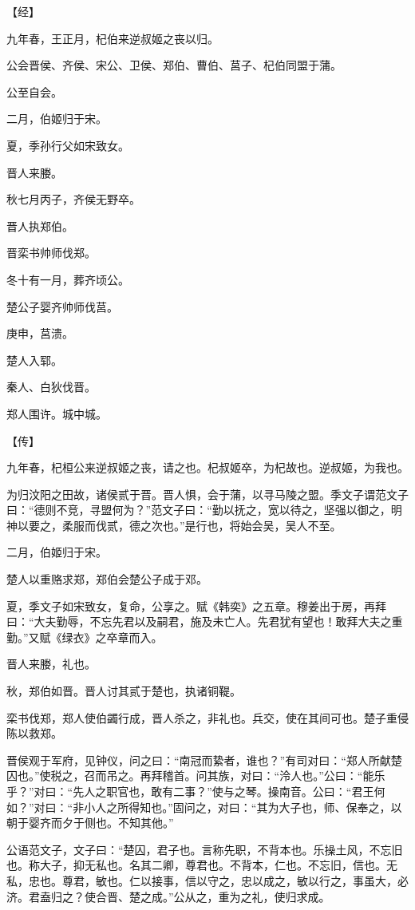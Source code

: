 \documentclass[a4paper,12pt,UTF8,twoside]{ctexbook}
\begin{document}
【经】

九年春，王正月，杞伯来逆叔姬之丧以归。

公会晋侯、齐侯、宋公、卫侯、郑伯、曹伯、莒子、杞伯同盟于蒲。

公至自会。

二月，伯姬归于宋。

夏，季孙行父如宋致女。

晋人来媵。

秋七月丙子，齐侯无野卒。

晋人执郑伯。

晋栾书帅师伐郑。

冬十有一月，葬齐顷公。

楚公子婴齐帅师伐莒。

庚申，莒溃。

楚人入郓。

秦人、白狄伐晋。

郑人围许。城中城。

【传】

九年春，杞桓公来逆叔姬之丧，请之也。杞叔姬卒，为杞故也。逆叔姬，为我也。

为归汶阳之田故，诸侯贰于晋。晋人惧，会于蒲，以寻马陵之盟。季文子谓范文子曰：“德则不竞，寻盟何为？”范文子曰：“勤以抚之，宽以待之，坚强以御之，明神以要之，柔服而伐贰，德之次也。”是行也，将始会吴，吴人不至。

二月，伯姬归于宋。

楚人以重赂求郑，郑伯会楚公子成于邓。

夏，季文子如宋致女，复命，公享之。赋《韩奕》之五章。穆姜出于房，再拜曰：“大夫勤辱，不忘先君以及嗣君，施及未亡人。先君犹有望也！敢拜大夫之重勤。”又赋《绿衣》之卒章而入。

晋人来媵，礼也。

秋，郑伯如晋。晋人讨其贰于楚也，执诸铜鞮。

栾书伐郑，郑人使伯蠲行成，晋人杀之，非礼也。兵交，使在其间可也。楚子重侵陈以救郑。

晋侯观于军府，见钟仪，问之曰：“南冠而絷者，谁也？”有司对曰：“郑人所献楚囚也。”使税之，召而吊之。再拜稽首。问其族，对曰：“泠人也。”公曰：“能乐乎？”对曰：“先人之职官也，敢有二事？”使与之琴。操南音。公曰：“君王何如？”对曰：“非小人之所得知也。”固问之，对曰：“其为大子也，师、保奉之，以朝于婴齐而夕于侧也。不知其他。”

公语范文子，文子曰：“楚囚，君子也。言称先职，不背本也。乐操土风，不忘旧也。称大子，抑无私也。名其二卿，尊君也。不背本，仁也。不忘旧，信也。无私，忠也。尊君，敏也。仁以接事，信以守之，忠以成之，敏以行之，事虽大，必济。君盍归之？使合晋、楚之成。”公从之，重为之礼，使归求成。
\end{document}
